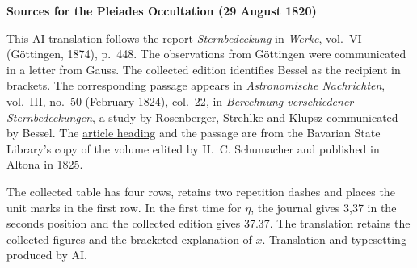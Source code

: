 \clearpage\thispagestyle{empty}
\begin{center}\textbf{Sources for the Pleiades Occultation (29 August 1820)}\end{center}
\noindent This AI translation follows the report \textit{Sternbedeckung} in \href{https://gdz.sub.uni-goettingen.de/id/PPN236007467}{\textit{Werke}, vol.~VI} (Göttingen, 1874), p.~448. The observations from Göttingen were communicated in a letter from Gauss. The collected edition identifies Bessel as the recipient in brackets. The corresponding passage appears in \textit{Astronomische Nachrichten}, vol.~III, no.~50 (February 1824), \href{https://api.digitale-sammlungen.de/iiif/image/v2/bsb10049428_00023/full/1800,/0/default.jpg}{col.~22}, in \textit{Berechnung verschiedener Sternbedeckungen}, a study by Rosenberger, Strehlke and Klupsz communicated by Bessel. The \href{https://api.digitale-sammlungen.de/iiif/image/v2/bsb10049428_00021/full/1800,/0/default.jpg}{article heading} and the passage are from the Bavarian State Library’s copy of the volume edited by H.~C. Schumacher and published in Altona in 1825.
\par\smallskip\noindent The collected table has four rows, retains two repetition dashes and places the unit marks in the first row. In the first time for $\eta$, the journal gives 3,37 in the seconds position and the collected edition gives 37.37. The translation retains the collected figures and the bracketed explanation of $x$. Translation and typesetting produced by AI.
\clearpage
